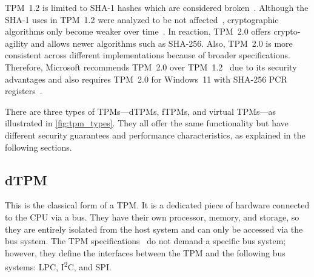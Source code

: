 %


TPM~1.2 is limited to SHA-1 hashes which are considered broken~\cite{cryptoeprint:2005/010, Wang2005, Stevens2017}.
Although the SHA-1 uses in TPM~1.2 were analyzed to be not affected~\cite{sha1tpm12}, cryptographic algorithms only become weaker over time~\cite{Arthur2015}.
In reaction, TPM~2.0 offers crypto-agility and allows newer algorithms such as SHA-256.
Also, TPM~2.0 is more consistent across different implementations because of broader specifications.
Therefore, Microsoft recommends TPM~2.0 over TPM~1.2~\cite{micrec} due to its security advantages and also requires TPM~2.0 for Windows~11 with SHA-256 PCR registers~\cite{win11req}.




There are three types of \acp{TPM}---\aclp{dTPM}, \aclp{fTPM}, and virtual TPMs---as illustrated in \autoref{fig:tpm_types}.
They all offer the same functionality but have different security guarantees and performance characteristics, as explained in the following sections.


\subsection{\Acl{dTPM}}

This is the classical form of a TPM\@.
It is a dedicated piece of hardware connected to the CPU via a bus.
They have their own processor, memory, and storage, so they are entirely isolated from the host system and can only be accessed via the bus system.
The TPM specifications~\cite{tpm20, tcgPcClientTpmProfile} do not demand a specific bus system; however, they define the interfaces between the TPM and the following bus systems: LPC, I\textsuperscript{2}C, and SPI\@.


